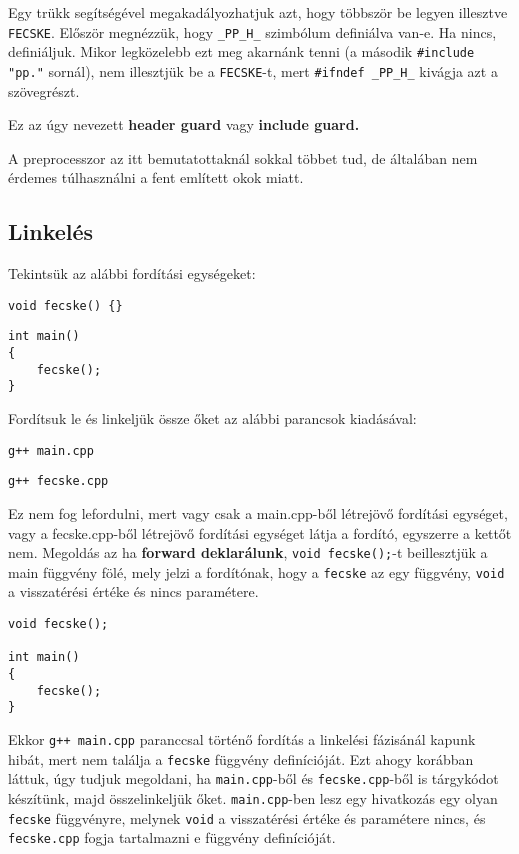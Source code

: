 \documentclass[a4paper,11.5pt,table]{article}
\begin{document}
	Egy trükk segítségével megakadályozhatjuk azt, hogy többször be legyen illesztve \texttt{FECSKE}. Először megnézzük, hogy \texttt{\_PP\_H\_} szimbólum definiálva van-e. Ha nincs, definiáljuk. Mikor legközelebb ezt meg akarnánk tenni (a második \texttt{\#include "pp."} sornál), nem illesztjük be a \texttt{FECSKE}-t, mert \texttt{\#ifndef \_PP\_H\_} kivágja azt a szövegrészt.
	
	Ez az úgy nevezett \textbf{header guard} vagy \textbf{include guard.}
	
	\medskip
	A preprocesszor az itt bemutatottaknál sokkal többet tud, de általában nem érdemes túlhasználni a fent említett okok miatt.
	
	\subsection{Linkelés}
	Tekintsük az alábbi fordítási egységeket:
	
	\smallskip
	\begin{lstlisting}
void fecske() {}
	\end{lstlisting}
	
	\smallskip
	\begin{lstlisting}
int main()
{
	fecske();
}
	\end{lstlisting}
	Fordítsuk le és linkeljük össze őket az alábbi parancsok kiadásával:
	
	{\centering\texttt{g++ main.cpp}\par}
	
	{\centering\texttt{g++ fecske.cpp}\par}
	
	Ez nem fog lefordulni, mert vagy csak a main.cpp-ből létrejövő fordítási egységet, vagy a fecske.cpp-ből létrejövő fordítási egységet látja a fordító, egyszerre a kettőt nem. Megoldás az ha \textbf{forward deklarálunk}, \texttt{void fecske();}-t beillesztjük a main függvény fölé, mely jelzi a fordítónak, hogy a \texttt{fecske} az egy függvény, \texttt{void} a visszatérési értéke és nincs paramétere. 
	
	\smallskip
	\begin{lstlisting}
void fecske();

int main()
{
	fecske();
}
	\end{lstlisting}
	Ekkor \texttt{g++ main.cpp} paranccsal történő fordítás a linkelési fázisánál kapunk hibát, mert nem találja a \texttt{fecske} függvény definícióját. Ezt ahogy korábban láttuk, úgy tudjuk megoldani, ha \texttt{main.cpp}-ből és \texttt{fecske.cpp}-ből is tárgykódot készítünk, majd összelinkeljük őket. \texttt{main.cpp}-ben lesz egy hivatkozás egy olyan \texttt{fecske} függvényre, melynek \texttt{void} a visszatérési értéke és paramétere nincs, és \texttt{fecske.cpp} fogja tartalmazni e függvény definícióját. 
		
\end{document}
